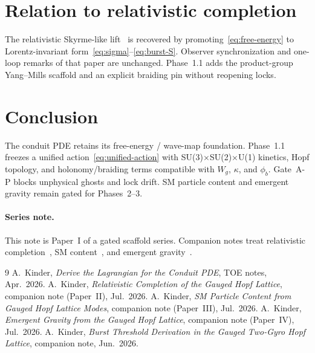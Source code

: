 \documentclass[11pt]{article}
\begin{document}
\section{Relation to relativistic completion}

The relativistic Skyrme-like lift~\cite{rel} is recovered by promoting~\eqref{eq:free-energy}
to Lorentz-invariant form~\eqref{eq:sigma}--\eqref{eq:burst-S}. Observer synchronization
and one-loop remarks of that paper are unchanged. Phase~1.1 adds the product-group
Yang--Mills scaffold and an explicit braiding pin without reopening locks.

\section{Conclusion}

The conduit PDE retains its free-energy / wave-map foundation. Phase~1.1 freezes a
unified action~\eqref{eq:unified-action} with SU(3)$\times$SU(2)$\times$U(1) kinetics,
Hopf topology, and holonomy/braiding terms compatible with $W_g$, $\kappa$, and
$\phi_b$. Gate~A-P blocks unphysical ghosts and lock drift. SM particle content and
emergent gravity remain gated for Phases~2--3.

\paragraph{Series note.}
This note is Paper~I of a gated scaffold series. Companion notes treat relativistic
completion~\cite{rel}, SM content~\cite{sm}, and emergent gravity~\cite{grav}.

\begin{thebibliography}{9}
A.~Kinder, \emph{Derive the Lagrangian for the Conduit PDE}, TOE notes, Apr.~2026.
A.~Kinder, \emph{Relativistic Completion of the Gauged Hopf Lattice},
companion note (Paper~II), Jul.~2026.
A.~Kinder, \emph{SM Particle Content from Gauged Hopf Lattice Modes},
companion note (Paper~III), Jul.~2026.
A.~Kinder, \emph{Emergent Gravity from the Gauged Hopf Lattice},
companion note (Paper~IV), Jul.~2026.
A.~Kinder, \emph{Burst Threshold Derivation in the Gauged Two-Gyro Hopf Lattice},
companion note, Jun.~2026.
\end{thebibliography}
\end{document}
